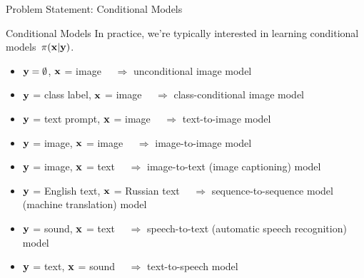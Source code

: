 \documentclass{beamer}
\begin{document}
\begin{frame}{Problem Statement: Conditional Models}
	\begin{block}{Conditional Models}
		In practice, we're typically interested in learning conditional models~$\pi(\mathbf{x} | \mathbf{y})$. 
		\begin{itemize}
			\item $\mathbf{y} = \emptyset$, $\mathbf{x}$ = image $\quad\Rightarrow$ unconditional image model
			\item $\mathbf{y}$ = class label, $\mathbf{x}$ = image $\quad\Rightarrow$ class-conditional image model
			\item $\mathbf{y}$ = text prompt, $\mathbf{x}$ = image $\quad\Rightarrow$ text-to-image model
			\item $\mathbf{y}$ = image, $\mathbf{x}$ = image $\quad\Rightarrow$ image-to-image model
			\item $\mathbf{y}$ = image, $\mathbf{x}$ = text $\quad\Rightarrow$ image-to-text (image captioning) model
			\item $\mathbf{y}$ = English text, $\mathbf{x}$ = Russian text $\quad\Rightarrow$ sequence-to-sequence model (machine translation) model
			\item $\mathbf{y}$ = sound, $\mathbf{x}$ = text $\quad\Rightarrow$ speech-to-text (automatic speech recognition) model
			\item $\mathbf{y}$ = text, $\mathbf{x}$ = sound $\quad\Rightarrow$ text-to-speech model
		\end{itemize}
	\end{block}
\end{frame}
\end{document}
